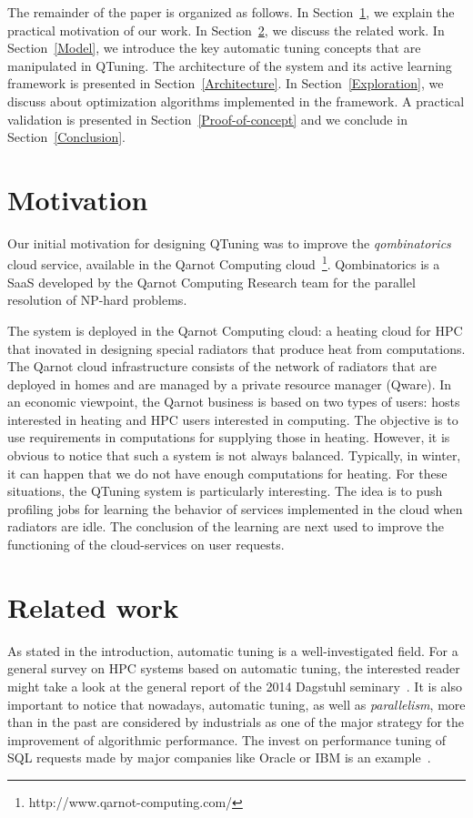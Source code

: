 \documentclass[10pt, conference, compsocconf]{IEEEtran}
\begin{document}
The remainder of the paper is organized as follows. In Section~\ref{Motivation}, we explain the practical motivation of 
our work. In Section~\ref{Related}, we discuss the related work. 
In Section~\ref{Model}, we introduce the key automatic tuning concepts that are manipulated in QTuning. 
The architecture of the system and its active learning framework is presented in Section~\ref{Architecture}. 
In Section~\ref{Exploration}, we discuss about optimization algorithms implemented in the framework. 
A practical validation is presented in Section~\ref{Proof-of-concept} and we conclude in 
Section~\ref{Conclusion}.


\section{Motivation} \label{Motivation}

Our initial motivation for designing QTuning was to improve the {\it qombinatorics} 
cloud service, available in the Qarnot Computing cloud~\footnote{http://www.qarnot-computing.com/}. Qombinatorics is a SaaS 
developed by the Qarnot Computing Research team for the parallel resolution of NP-hard problems.

The system is deployed in the Qarnot Computing cloud: a heating cloud for HPC that inovated in designing special radiators that produce heat from computations. The Qarnot cloud infrastructure consists of the network of radiators that are deployed in homes and are managed by a private resource manager (Qware). 
In an economic viewpoint, the Qarnot business is based on two types of users: hosts interested in heating and HPC users interested 
in computing. The objective is to use requirements in computations for supplying those in heating.
However, it is obvious to notice that such a system is not always balanced. Typically, in winter, it can happen that we 
do not have enough computations for heating. For these situations, the QTuning system is particularly interesting. 
The idea is to push profiling jobs for learning the behavior of services implemented in the cloud when radiators are idle. 
The conclusion of the learning are next used to improve the functioning of the cloud-services on user requests.




\section{Related work} \label{Related}

As stated in the introduction, automatic tuning  is a well-investigated field. For a general survey on HPC systems based on 
automatic tuning, the interested reader might take a look at the general report of the 2014 Dagstuhl seminary~\cite{benkner_et_al:DR:2014:4423}. 
It is also important to notice that nowadays, automatic tuning, as well as  {\it parallelism}, more than in the past 
are considered by industrials as one of the major strategy for the improvement of algorithmic performance. The invest on 
performance tuning of SQL requests made by major companies  like Oracle or IBM is an example~\cite{Oracle}. 
\end{document}
